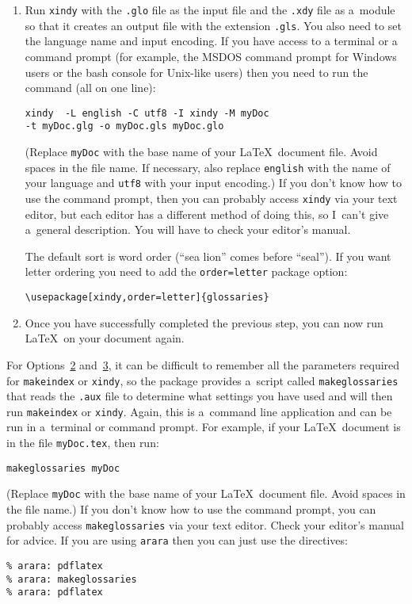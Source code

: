 \documentclass{nlctdoc}
\newcommand*{\optsand}[2]{Options~\hyperlink{option#1}{#1}
and~\hyperlink{option#2}{#2}}
\begin{document}
\begin{description}
\begin{enumerate}
    \item Run \texttt{xindy} with the \texttt{.glo} file as the
    input file and the \texttt{.xdy} file as a~module so that
    it creates an output file with the extension \texttt{.gls}. You 
    also need to set the language name and input encoding. If
    you have access to a terminal or a command prompt (for example, the
    MSDOS command prompt for Windows users or the bash console for
    Unix-like users) then you need to run the command (all on one
    line):
\begin{verbatim}
xindy  -L english -C utf8 -I xindy -M myDoc 
-t myDoc.glg -o myDoc.gls myDoc.glo
\end{verbatim}
    (Replace \texttt{myDoc} with the base name of your \LaTeX\
    document file. Avoid spaces in the file name. If necessary, also replace
    \texttt{english} with the name of your language and \texttt{utf8}
    with your input encoding.) If you don't know
    how to use the command prompt, then you can probably access
    \texttt{xindy} via your text editor, but each editor has a
    different method of doing this, so I~can't give a~general
    description. You will have to check your editor's manual.

    The default sort is word order (``sea lion'' comes before ``seal''). 
    If you want letter ordering you need to add the
    \texttt{order=letter} package option:
\begin{verbatim}
\usepackage[xindy,order=letter]{glossaries}
\end{verbatim}

    \item Once you have successfully completed the previous step,
    you can now run \LaTeX\ on your document again.

   \end{enumerate}

\end{description}

For \optsand23, it can be difficult to remember all the
parameters required for \texttt{makeindex} or \texttt{xindy}, so the
\sty{glossaries} package provides a~script called
\texttt{makeglossaries} that reads the \texttt{.aux} file to
determine what settings you have used and will then run
\texttt{makeindex} or \texttt{xindy}. Again, this is a~command line
application and can be run in a~terminal or command prompt. For
example, if your \LaTeX\ document is in the file \texttt{myDoc.tex},
then run:
\begin{verbatim}
makeglossaries myDoc
\end{verbatim}
(Replace \texttt{myDoc} with the base name of your \LaTeX\ document
file. Avoid spaces in the file name.) If you don't know how to use
the command prompt, you can probably access \texttt{makeglossaries}
via your text editor. Check your editor's manual for advice. If you
are using \texttt{arara} then you can just use the directives:
\begin{verbatim}
% arara: pdflatex
% arara: makeglossaries
% arara: pdflatex
\end{verbatim}
\end{document}
